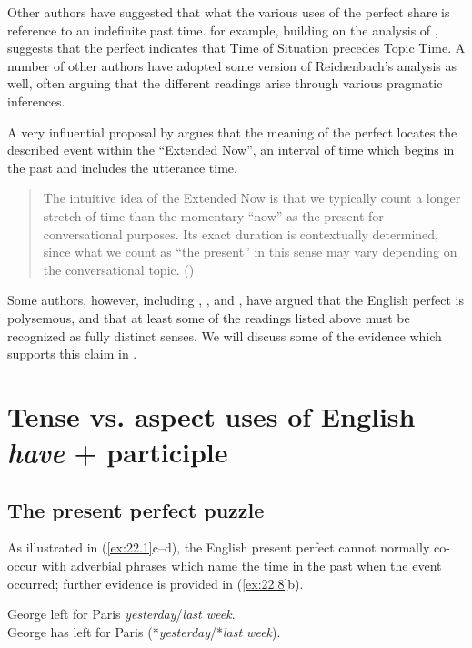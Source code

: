 Other authors have suggested that what the various uses of the perfect share is reference to an indefinite past time. \citet{Klein1992,Klein1994} for example, building on the analysis of \citet{Reichenbach1947}, suggests that the perfect indicates that Time of Situation precedes Topic Time. A number of other authors have adopted some version of Reichenbach’s analysis as well, often arguing that the different readings arise through various pragmatic inferences.



A very influential proposal by \citet{McCoard1978} argues that the meaning of the perfect locates the described event within the “Extended Now”, an interval of time which begins in the past and includes the utterance time.


\begin{quote}
The intuitive idea of the Extended Now is that we typically count a longer stretch of time than the momentary “now” as the present for conversational purposes. Its exact duration is contextually determined, since what we count as “the present” in this sense may vary depending on the conversational topic. (\citealt{Portner2003}) 
\end{quote}


Some authors, however, including \citet{McCawley1971,McCawley1981b}, \citet{Michaelis1994,Michaelis1998}, and \citet{Kiparsky2002}, have argued that the English perfect is polysemous, and that at least some of the readings listed above must be recognized as fully distinct senses. We will discuss some of the evidence which supports this claim in .

\largerpage[2]
\section{Tense vs. aspect uses of English \textit{have} + participle}\label{sec:22.3}
\subsection{The present perfect puzzle}
\label{sec:22.3.1}


As illustrated in (\ref{ex:22.1}c--d), the English present perfect cannot normally co-occur with adverbial phrases which name the time in the past when the event occurred; further evidence is provided in (\ref{ex:22.8}b).


\ea \label{ex:22.8}
\ea George left for Paris {\textit{yesterday}/\textit{last week}}.\\
\ex George has left for Paris ({*\textit{yesterday}/*\textit{last week}}).
                       \z
\z


